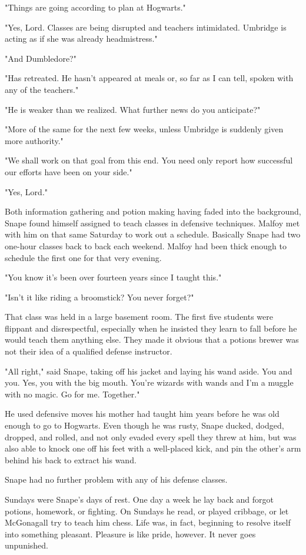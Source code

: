 "Things are going according to plan at Hogwarts."

"Yes, Lord. Classes are being disrupted and teachers intimidated. Umbridge is acting as if she was already headmistress."

"And Dumbledore?"

"Has retreated. He hasn't appeared at meals or, so far as I can tell, spoken with any of the teachers."

"He is weaker than we realized. What further news do you anticipate?"

"More of the same for the next few weeks, unless Umbridge is suddenly given more authority."

"We shall work on that goal from this end. You need only report how successful our efforts have been on your side."

"Yes, Lord."

Both information gathering and potion making having faded into the background, Snape found himself assigned to teach classes in defensive techniques. Malfoy met with him on that same Saturday to work out a schedule. Basically Snape had two one-hour classes back to back each weekend. Malfoy had been thick enough to schedule the first one for that very evening.

"You know it's been over fourteen years since I taught this."

"Isn't it like riding a broomstick? You never forget?"

That class was held in a large basement room. The first five students were flippant and disrespectful, especially when he insisted they learn to fall before he would teach them anything else. They made it obvious that a potions brewer was not their idea of a qualified defense instructor.

"All right," said Snape, taking off his jacket and laying his wand aside. You and you. Yes, you with the big mouth. You're wizards with wands and I'm a muggle with no magic. Go for me. Together."

He used defensive moves his mother had taught him years before he was old enough to go to Hogwarts. Even though he was rusty, Snape ducked, dodged, dropped, and rolled, and not only evaded every spell they threw at him, but was also able to knock one off his feet with a well-placed kick, and pin the other's arm behind his back to extract his wand.

Snape had no further problem with any of his defense classes.

Sundays were Snape's days of rest. One day a week he lay back and forgot potions, homework, or fighting. On Sundays he read, or played cribbage, or let McGonagall try to teach him chess. Life was, in fact, beginning to resolve itself into something pleasant. Pleasure is like pride, however. It never goes unpunished.

